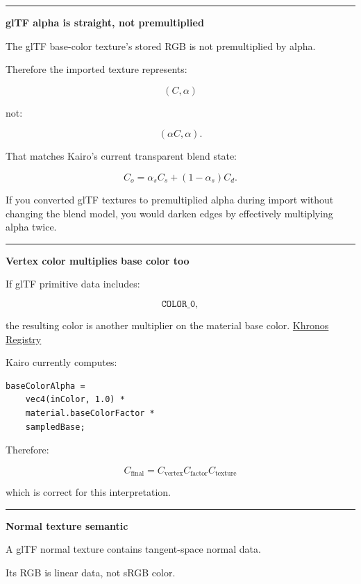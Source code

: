 \begin{center}\rule{0.5\linewidth}{0.5pt}\end{center}

\textbf{glTF alpha is straight, not premultiplied}

The glTF base-color texture's stored RGB is not premultiplied by alpha.

Therefore the imported texture represents:

\[
(C,\alpha)
\]

not:

\[
(\alpha C,\alpha).
\]

That matches Kairo's current transparent blend state:

\[
C_o
=
\alpha_sC_s+
(1-\alpha_s)C_d.
\]

If you converted glTF textures to premultiplied alpha during import without changing the blend model, you would darken edges by effectively multiplying alpha twice.

\begin{center}\rule{0.5\linewidth}{0.5pt}\end{center}

\textbf{Vertex color multiplies base color too}

If glTF primitive data includes:

\[
\texttt{COLOR\_0},
\]

the resulting color is another multiplier on the material base color. \href{https://registry.khronos.org/glTF/specs/2.0/glTF-2.0.html?utm_source=chatgpt.com}{Khronos Registry}

Kairo currently computes:

\begin{verbatim}
baseColorAlpha =
    vec4(inColor, 1.0) *
    material.baseColorFactor *
    sampledBase;
\end{verbatim}

Therefore:

\[
\boxed{
C_{\text{final}}
=
C_{\text{vertex}}
C_{\text{factor}}
C_{\text{texture}}
}
\]

which is correct for this interpretation.

\begin{center}\rule{0.5\linewidth}{0.5pt}\end{center}

\textbf{Normal texture semantic}

A glTF normal texture contains tangent-space normal data.

Its RGB is linear data, not sRGB color.

